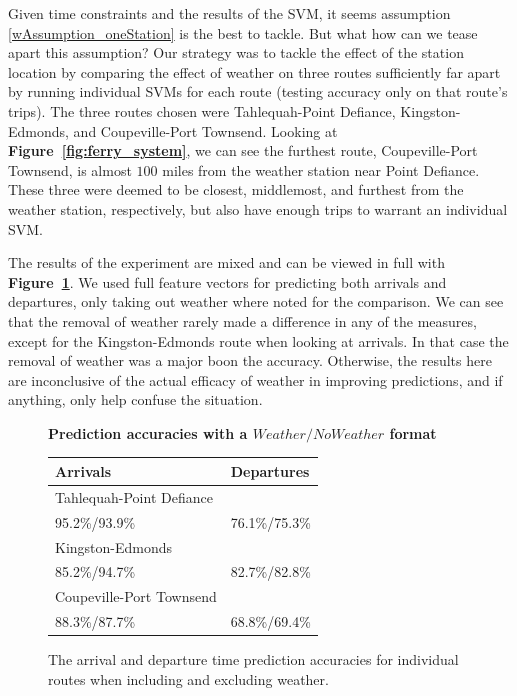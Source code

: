 \documentclass[11pt]{article} %
\begin{document}
Given time constraints and the results of the SVM, it seems assumption 
\ref{wAssumption_oneStation} is the best to tackle. But what how can we tease
apart this assumption? Our strategy was to tackle the effect of the station
location by comparing the effect of weather on three routes sufficiently far apart
by running individual SVMs for each route (testing accuracy only on that route's 
trips). The three routes chosen were Tahlequah-Point Defiance, Kingston-Edmonds,
and Coupeville-Port Townsend. Looking at \textbf{Figure~\ref{fig:ferry_system}},
we can see the furthest route, Coupeville-Port Townsend, is almost $100$ miles
from the weather station near Point Defiance. These three were deemed to be 
closest, middlemost, and furthest from the weather station, respectively, but also 
have enough trips to warrant an individual SVM. 

The results of the experiment are mixed and can be viewed in full with 
\textbf{Figure~\ref{fig:weatherExperiment}}. We used full feature vectors for 
predicting both arrivals and departures, only taking out weather where noted
for the comparison. We can see that the removal of weather rarely made a difference
in any of the measures, except for the Kingston-Edmonds route when looking at 
arrivals. In that case the removal of weather was a major boon the accuracy. 
Otherwise, the results here are inconclusive of the actual efficacy of weather
in improving predictions, and if anything, only help confuse the situation.

\begin{figure}
    \centering
    \textbf{Prediction accuracies with a $Weather/NoWeather$ format}

    \begin{tabular}{ll}
        \textbf{Arrivals} & \textbf{Departures}\\
        \hline
        Tahlequah-Point Defiance    & \\
        95.2\%/93.9\% & 76.1\%/75.3\% \\
        Kingston-Edmonds    & \\
        85.2\%/94.7\% & 82.7\%/82.8\% \\
        Coupeville-Port Townsend     & \\
        88.3\%/87.7\% & 68.8\%/69.4\% 
    \end{tabular}
    \caption{The arrival and departure time prediction accuracies for individual 
        routes when including and excluding weather.}
    \label{fig:weatherExperiment}
\end{figure}
\end{document}
